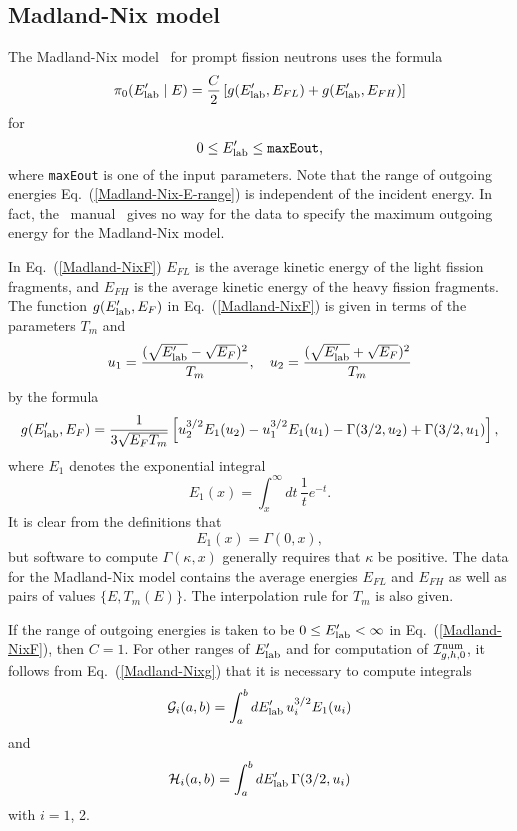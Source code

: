 \subsection{Madland-Nix model}\label{Sec:Madland}

The Madland-Nix model~\cite{Madland} for prompt fission neutrons uses 
the formula
\begin{equation}
  \pi_0(E_{\text{lab}}'  \mid E) = \frac{C}{2}\, [g(E_{\text{lab}}' , E_{FL}) + g(E_{\text{lab}}' , E_{FH})]
 \label{Madland-NixF}
\end{equation}
for
\begin{equation}
 0 \le E_{\text{lab}}' \le \texttt{maxEout},
 \label{Madland-Nix-E-range}
\end{equation}
where \texttt{maxEout} is one of the input parameters.
Note that the range of outgoing energies Eq.~(\ref{Madland-Nix-E-range})
is independent of the incident energy.
In fact, the \ENDF\ manual~\cite{ENDFB} gives no way for the data to specify the
maximum outgoing energy for the Madland-Nix model. 

In Eq.~(\ref{Madland-NixF}) $E_{FL}$ is the average kinetic energy of the light fission
fragments, and $E_{FH}$ is the average kinetic energy of the heavy fission
fragments.  The function $g(E_{\text{lab}}' , E_F)$ in Eq.~(\ref{Madland-NixF}) is given in terms
of the parameters $T_m$ and
\begin{equation}
   u_1 = \frac{(\sqrt{E_{\text{lab}}' } - \sqrt{E_F})^2}{T_m}, \quad
   u_2 = \frac{(\sqrt{E_{\text{lab}}' } + \sqrt{E_F})^2}{T_m}
 \label{Madland-Nixu}
\end{equation}
by the formula
\begin{equation}
   g(E_{\text{lab}}' , E_F) = \frac{1}{3\sqrt{E_F T_m}}
   \left[
     u_2^{3/2}E_1(u_2) - u_1^{3/2}E_1(u_1) -
     \Gamma(3/2, u_2) + \Gamma(3/2, u_1)
   \right],
 \label{Madland-Nixg}
\end{equation}
where $E_1$ denotes the exponential integral
$$
  E_1(x) = \int_x^\infty dt\, \frac{1}{t}e^{-t}.
$$
It is clear from the definitions that
$$
  E_1(x) = \Gamma(0, x),
$$
but software to compute $\Gamma(\kappa, x)$ generally requires
that $\kappa$ be positive.
The data for the Madland-Nix model contains the average energies
$E_{FL}$ and $E_{FH}$ as well as pairs of values $\{E, T_m(E)\}$.
The interpolation rule for $T_m$ is also given.

If the range of outgoing energies is taken to be $0 \le E_{\text{lab}}'  < \infty$ 
in Eq.~(\ref{Madland-NixF}), then $C = 1$.  For other ranges of $E_{\text{lab}}' $
and for computation of ${\cal I}^{\text{num}}_{g,h,0}$, it follows from Eq.~(\ref{Madland-Nixg})
that it is necessary to compute integrals
\begin{equation}
 {\cal G}_i( a, b ) =  \int_a^b dE_{\text{lab}}'  \, u_i^{3/2}E_1(u_i)
 \label{Madland-Nix-u-integral}
\end{equation}
and
\begin{equation}
 {\cal H}_i( a, b ) =   \int_a^b dE_{\text{lab}}'  \, \Gamma(3/2, u_i)
 \label{Madland-Nix-Gamma-integral}
\end{equation}
with $i = 1$, 2.

